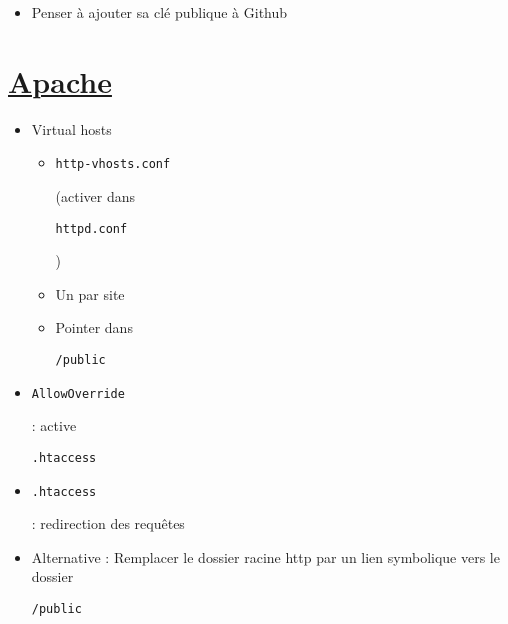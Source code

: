 \begin{otherlanguage}{english}

\begin{Shaded}
\begin{Highlighting}[]
 
 
 
 
 
 
\end{Highlighting}
\end{Shaded}

\end{otherlanguage}

\begin{itemize}
\tightlist
\item
  Penser à ajouter sa clé publique à Github
\end{itemize}

\hypertarget{apache}{%
\section{\texorpdfstring{\href{https://help.ubuntu.com/lts/serverguide/httpd.html}{Apache}}{Apache}}\label{apache}}

\begin{itemize}
\tightlist
\item
  Virtual hosts

  \begin{itemize}
  \tightlist
  \item
    \begin{otherlanguage}{english}\texttt{http-vhosts.conf}\end{otherlanguage}
    (activer dans
    \begin{otherlanguage}{english}\texttt{httpd.conf}\end{otherlanguage})
  \item
    Un par site
  \item
    Pointer dans
    \begin{otherlanguage}{english}\texttt{/public}\end{otherlanguage}
  \end{itemize}
\item
  \begin{otherlanguage}{english}\texttt{AllowOverride}\end{otherlanguage}
  : active
  \begin{otherlanguage}{english}\texttt{.htaccess}\end{otherlanguage}
\item
  \begin{otherlanguage}{english}\texttt{.htaccess}\end{otherlanguage} :
  redirection des requêtes
\item
  Alternative : Remplacer le dossier racine http par un lien symbolique
  vers le dossier
  \begin{otherlanguage}{english}\texttt{/public}\end{otherlanguage}
\end{itemize}

